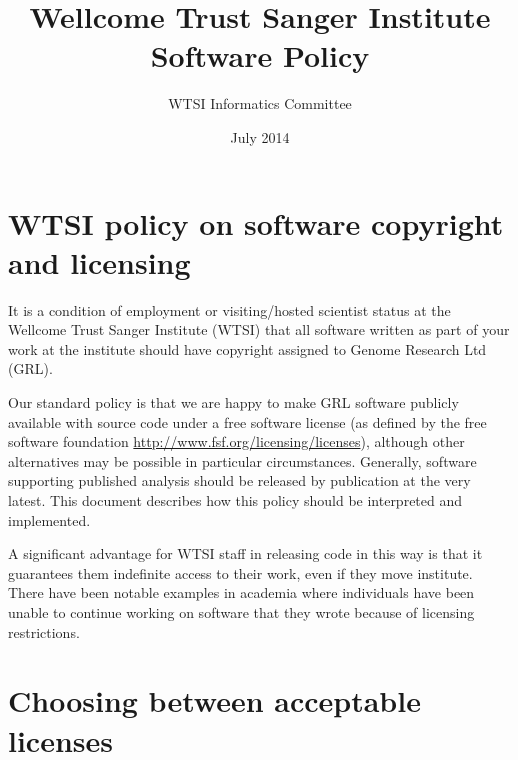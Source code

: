 \documentclass[10pt,a4paper]{article}
\begin{document}
\title{
Wellcome Trust Sanger Institute \\
Software Policy
}
\author{WTSI Informatics Committee}
\date{July 2014}

\maketitle

\newcommand{\docsperson}[0]{Martin Dougherty} 

\newcommand{\filename}[1]{\texttt{#1}} 

\newenvironment{boilerplate}{\bgroup\small\samepage }{\egroup} 


\section*{WTSI policy on software copyright and licensing}
It is a condition of employment or visiting/hosted scientist status at the Wellcome Trust 
Sanger Institute (WTSI) that all software written as part of your work at the institute 
should have copyright assigned to Genome Research Ltd (GRL). 
 
Our standard policy is that we are happy to make GRL software publicly available with 
source code under a free software license (as defined by the free software foundation 
\url{http://www.fsf.org/licensing/licenses}), although other alternatives may be possible in 
particular circumstances. Generally, software supporting published analysis should be 
released by publication at the very latest. This document describes how this policy 
should be interpreted and implemented. 
 
A significant advantage for WTSI staff in releasing code in this way is that it guarantees 
them indefinite access to their work, even if they move institute. There have been 
notable examples in academia where individuals have been unable to continue working 
on software that they wrote because of licensing restrictions.


\section{Choosing between acceptable licenses}
\end{document}
